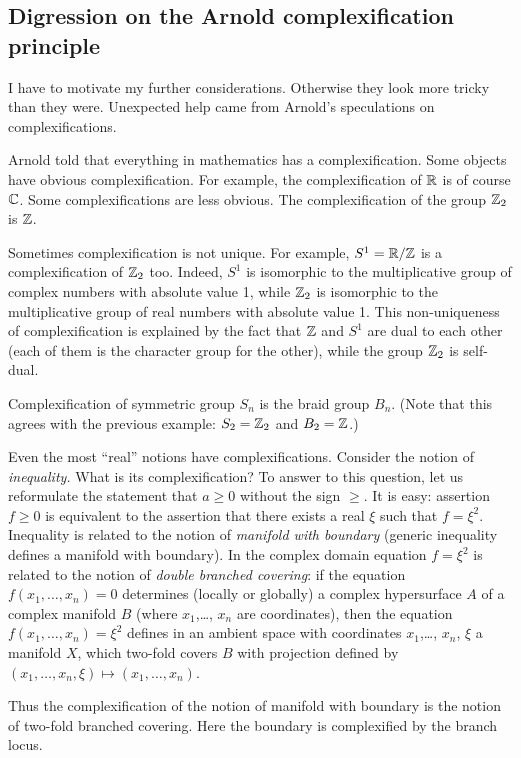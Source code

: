 \documentclass{article}
\numberwithin{equation}{section}
\begin{document}
\subsection{Digression on the Arnold complexification principle }\label{s2.1}  
I have to motivate my
further considerations. Otherwise they look more tricky than they
were. Unexpected help came from Arnold's speculations on
complexifications.

Arnold told that everything in mathematics has a complexification.
Some objects have obvious complexification. For example, the
complexification of $\mathbb R$ is of course $\mathbb C$. Some complexifications are
less obvious. The complexification of the group $\mathbb Z_2$ is $\mathbb Z$.

Sometimes complexification is not unique. For example, $S^1=\mathbb R/\mathbb Z$ is a
complexification of $\mathbb Z_2$ too. Indeed, $S^1$ is isomorphic to the
multiplicative group of complex numbers with absolute value 1, while
$\mathbb Z_2$ is isomorphic to the multiplicative group of real numbers with
absolute value 1. This non-uniqueness of complexification is
explained by the fact that $\mathbb Z$ and $S^1$ are dual to each other
(each of them is the character group for the other), while the group
$\mathbb Z_2$ is self-dual.

Complexification of symmetric group $S_n$ is the braid group $B_n$.
(Note that this agrees with the previous example: $S_2=\mathbb Z_2$ and
$B_2=\mathbb Z$.)

Even the most ``real'' notions have complexifications. Consider the
notion of {\it inequality.\/} What is its complexification? To answer to
this question, let us reformulate the statement that $a\ge0$ without
the sign $\ge$. It is easy: assertion $f\ge0$ is equivalent to the
assertion that there exists a real $\xi$ such that $f=\xi^2$.
Inequality is related to the notion of {\it manifold with
boundary\/} (generic inequality defines a manifold with boundary).
In the complex domain equation $f=\xi^2$ is related to the
notion of {\it double branched covering\/}: if the equation
$f(x_1,\dots,x_n)=0$ determines (locally or globally) a complex
hypersurface $A$ of a complex manifold $B$ (where $x_1$,\dots, $x_n$
are coordinates), then the equation $f(x_1,\dots,x_n)=\xi^2$ defines
in an ambient space with coordinates $x_1$,\dots, $x_n$, $\xi$ a
manifold $X$, which two-fold covers $B$ with projection defined by
$(x_1,\dots,x_n,\xi)\mapsto(x_1,\dots,x_n)$.

Thus the complexification of the notion of manifold with boundary is
the notion of two-fold branched covering. Here the boundary is
complexified by the branch locus.
\end{document}
